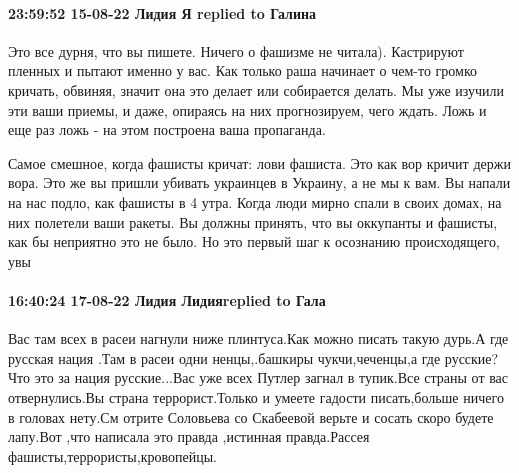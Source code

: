  
 
 
 
 

\paragraph{23:59:52 15-08-22 Лидия Я replied to Галина}

Это все дурня, что вы пишете. Ничего о фашизме не читала). Кастрируют пленных и
пытают именно у вас. Как только раша начинает о чем-то громко кричать, обвиняя,
значит она это делает или собирается делать. Мы уже изучили эти ваши приемы, и
даже, опираясь на них прогнозируем, чего ждать. Ложь и еще раз ложь - на этом
построена ваша пропаганда.

Самое смешное, когда фашисты кричат: лови фашиста. Это как вор кричит держи
вора. Это же вы пришли убивать украинцев в Украину, а не мы к вам. Вы напали на
нас подло, как фашисты в 4 утра. Когда люди мирно спали в своих домах, на них
полетели ваши ракеты. Вы должны принять, что вы оккупанты и фашисты, как бы
неприятно это не было. Но это первый шаг к осознанию происходящего, увы

\paragraph{16:40:24 17-08-22 Лидия Лидияreplied to Гала}

Вас там всех в расеи нагнули ниже плинтуса.Как можно писать такую дурь.А где
русская нация .Там в расеи одни ненцы,.башкиры чукчи,чеченцы,а где русские?Что
это за нация русские...Вас уже всех Путлер загнал в тупик.Все страны от вас
отвернулись.Вы страна террорист.Только и умеете гадости писать,больше ничего в
головах нету.См отрите Соловьева со Скабеевой верьте и сосать скоро будете
лапу.Вот ,что написала это правда ,истинная правда.Рассея
фашисты,террористы,кровопейцы.
